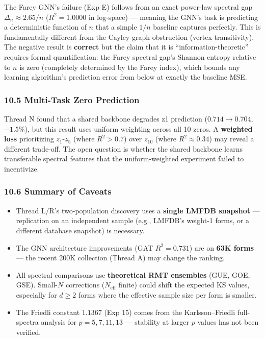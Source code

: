\documentclass[
]{article}
\providecommand{\tightlist}{%
  \setlength{\itemsep}{0pt}\setlength{\parskip}{0pt}}
\begin{document}
The Farey GNN's failure (Exp E) follows from an exact power-law spectral
gap \(\Delta_n \approx 2.65/n\) (\(R^2 = 1.0000\) in log-space) ---
meaning the GNN's task is predicting a deterministic function of \(n\)
that a simple \(1/n\) baseline captures perfectly. This is fundamentally
different from the Cayley graph obstruction (vertex-transitivity). The
negative result is \textbf{correct} but the claim that it is
``information-theoretic'' requires formal quantification: the Farey
spectral gap's Shannon entropy relative to \(n\) is zero (completely
determined by the Farey index), which bounds any learning algorithm's
prediction error from below at exactly the baseline MSE.

\hypertarget{multi-task-zero-prediction}{%
\subsubsection{10.5 Multi-Task Zero
Prediction}\label{multi-task-zero-prediction}}

Thread N found that a shared backbone degrades z1 prediction
(\(0.714 \to 0.704\), \(-1.5\%\)), but this result uses uniform
weighting across all 10 zeros. A \textbf{weighted loss} prioritizing
\(z_1\)-\(z_5\) (where \(R^2 > 0.7\)) over \(z_{10}\) (where
\(R^2 \approx 0.34\)) may reveal a different trade-off. The open
question is whether the shared backbone learns transferable spectral
features that the uniform-weighted experiment failed to incentivize.

\hypertarget{summary-of-caveats}{%
\subsubsection{10.6 Summary of Caveats}\label{summary-of-caveats}}

\begin{itemize}
\tightlist
\item
  Thread L/R's two-population discovery uses a \textbf{single LMFDB
  snapshot} --- replication on an independent sample (e.g., LMFDB's
  weight-1 forms, or a different database snapshot) is necessary.
\item
  The GNN architecture improvements (GAT \(R^2 = 0.731\)) are on
  \textbf{63K forms} --- the recent 200K collection (Thread A) may
  change the ranking.
\item
  All spectral comparisons use \textbf{theoretical RMT ensembles} (GUE,
  GOE, GSE). Small-\(N\) corrections (\(N_{\text{eff}}\) finite) could
  shift the expected KS values, especially for \(d\ge 2\) forms where
  the effective sample size per form is smaller.
\item
  The Friedli constant \(1.1367\) (Exp 15) comes from the
  Karlsson--Friedli full-spectra analysis for \(p=5,7,11,13\) ---
  stability at larger \(p\) values has not been verified.
\end{itemize}
\end{document}
